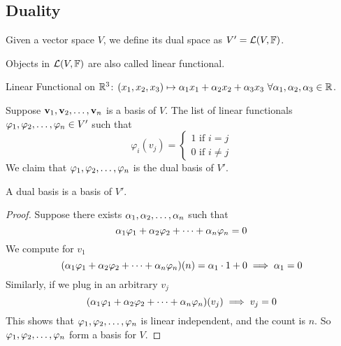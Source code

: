 \subsection{Duality}
\begin{definition}
    Given a vector space $V$, we define its dual space as $V' = \mathcal L(V,\mathbb F)$. 
\end{definition}
\begin{remark}
    Objects in $\mathcal L(V,\mathbb F)$ are also called linear functional.
\end{remark}
\begin{example}
    Linear Functional on $\mathbb R^3$: $(x_1, x_2, x_3) \mapsto \alpha_1 x_1 + \alpha_2 x_2 + \alpha_3 x_3 \ \forall \alpha_1, \alpha_2, \alpha_3 \in \mathbb R$.
\end{example}
\begin{definition}
    Suppose ${\mathbf v}_1,{\mathbf v}_2, \ldots, {\mathbf v}_{n}$ is a basis of $V$. The list of linear functionals ${\varphi}_1,{\varphi}_2, \ldots, {\varphi}_{n} \in  V'$ such that \[\varphi_i(v_j) = \left\{ \begin{array}{cc}
         1 \text{ if } i = j \\
         0 \text{ if } i \neq j
    \end{array} \right.\] We claim that ${\varphi}_1,{\varphi}_2, \ldots, {\varphi}_{n}$ is the dual basis of $V'$.
\end{definition}
\begin{lemma}
    A dual basis is a basis of $V'$.
\end{lemma}
\begin{proof}
    Suppose there exists ${\alpha}_1,{\alpha}_2, \ldots, {\alpha}_{n}$ such that 
    \[ {\alpha}_1{\varphi}_1 + {\alpha}_2{\varphi}_2 + \cdots + {\alpha}_{n}{\varphi}_{n} = 0\]
    We compute for $v_1$
    \[ ({\alpha}_1{\varphi}_1 + {\alpha}_2{\varphi}_2 + \cdots + {\alpha}_{n}{\varphi}_{n})(n) = \alpha_1 \cdot 1 + 0 \implies \alpha_1 = 0\]
    Similarly, if we plug in an arbitrary $v_j$
    \[ ({\alpha}_1{\varphi}_1 + {\alpha}_2{\varphi}_2 + \cdots + {\alpha}_{n}{\varphi}_{n})(v_j) \implies v_j = 0\]
    This shows that ${\varphi}_1,{\varphi}_2, \ldots, {\varphi}_{n}$ is linear independent, and the count is $n$. So ${\varphi}_1,{\varphi}_2, \ldots, {\varphi}_{n}$ form a basis for $V$.
\end{proof}
